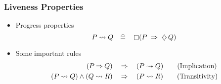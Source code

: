\begin{frame}
  \frametitle{Liveness Properties}

  \begin{itemize}
  \item \alert{Progress} properties
    \[P \leadsto Q  ~~~\widehat{=}~~~ \mathop{\square} (P ~\mathbin\Rightarrow~ \mathop{\diamondsuit} Q)\]
  \item Some important rules
  \begin{align}
    (P \mathbin\Rightarrow Q) ~~~&\mathbin\Rightarrow~~~ (P \leadsto Q)
    \tag{Implication}\label{eq:implication} \\
    (P \leadsto Q) \land (Q \leadsto R) ~~~&\mathbin\Rightarrow~~~ (P \leadsto R)
    \tag{Transitivity}\label{eq:transitivity}
  \end{align}
  \end{itemize}
\end{frame}

